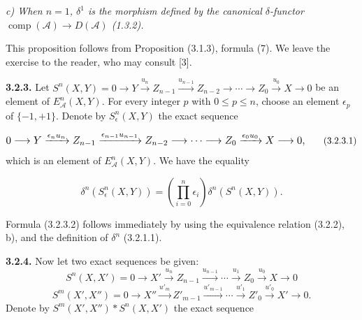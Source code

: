 \clearpage
{}%
\begingroup\small\setlength{\parskip}{0pt}\setlength{\emergencystretch}{1.5em}
\setlength{\abovedisplayskip}{4pt plus 2pt minus 2pt}%
\setlength{\belowdisplayskip}{4pt plus 2pt minus 2pt}%

\noindent\textit{c) When $n=1$, $\delta^1$ is the morphism defined by the
canonical $\delta$-functor
$\operatorname{comp}(\mathcal A)\longrightarrow D(\mathcal A)$ (1.3.2).}

This proposition follows from Proposition (3.1.3), formula (7). We leave the
exercise to the reader, who may consult [3].

\medskip\noindent\textbf{3.2.3.}\quad
Let
$S^n(X,Y)=0\longrightarrow Y\xrightarrow{u_n}Z_{n-1}
\xrightarrow{u_{n-1}}Z_{n-2}\longrightarrow\cdots\longrightarrow Z_0
\xrightarrow{u_0}X\longrightarrow0$
be an element of $E_{\mathcal A}^{n}(X,Y)$. For every integer $p$ with
$0\leq p\leq n$, choose an element $\epsilon_p$ of $\{-1,+1\}$. Denote by
$S_{\epsilon}^{n}(X,Y)$ the exact sequence

\begin{equation}
\resizebox{0.94\textwidth}{!}{$\displaystyle
0\longrightarrow Y\xrightarrow{\epsilon_nu_n}Z_{n-1}
\xrightarrow{\epsilon_{n-1}u_{n-1}}Z_{n-2}\longrightarrow\cdots
\longrightarrow Z_0\xrightarrow{\epsilon_0u_0}X\longrightarrow0,
$}
\tag{3.2.3.1}
\end{equation}
which is an element of $E_{\mathcal A}^{n}(X,Y)$. We have the equality

\begin{equation}
\delta^n(S_{\epsilon}^{n}(X,Y))=
\left(\prod_{i=0}^{n}\epsilon_i\right)\delta^n(S^n(X,Y)).
\tag{3.2.3.2}
\end{equation}

Formula (3.2.3.2) follows immediately by using the equivalence relation
(3.2.2), b), and the definition of $\delta^n$ (3.2.1.1).

\medskip\noindent\textbf{3.2.4.}\quad
Now let two exact sequences be given:
\[
S^n(X,X')=0\longrightarrow X'\xrightarrow{u_n}Z_{n-1}
\xrightarrow{u_{n-1}}\cdots\xrightarrow{u_1}Z_0
\xrightarrow{u_0}X\longrightarrow0
\]
\[
S^m(X',X'')=0\longrightarrow X''\xrightarrow{u'_m}Z'_{m-1}
\xrightarrow{u'_{m-1}}\cdots\xrightarrow{u'_1}Z'_0
\xrightarrow{u'_0}X'\longrightarrow0.
\]
Denote by $S^m(X',X'')*S^n(X,X')$ the exact sequence

